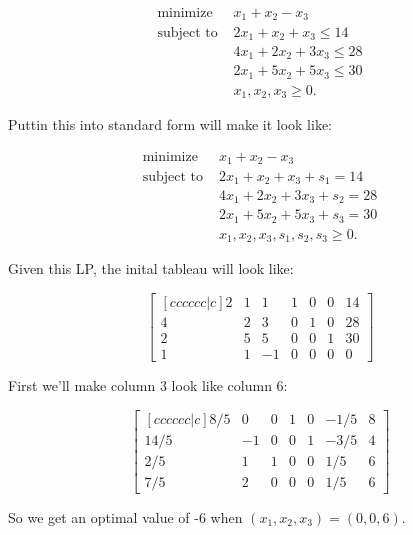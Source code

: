 \documentclass[12pt]{extarticle}
\theoremstyle{definition}
\begin{document}
\begin{problem} 

	\begin{align*}
	\text{minimize } &x_1+x_2-x_3\\
	\text{subject to } &2x_1+x_2+x_3\leq 14\\
	&4x_1+2x_2+3x_3\leq 28\\
	&2x_1+5x_2+5x_3\leq 30\\
	&x_1, x_2, x_3\geq 0.
	\end{align*}

	Puttin this into standard form will make it look like:

	\begin{align*}
	\text{minimize } &x_1+x_2-x_3\\
	\text{subject to } &2x_1+x_2+x_3+s_1 = 14\\
	&4x_1+2x_2+3x_3+s_2 = 28\\
	&2x_1+5x_2+5x_3+s_3 = 30\\
	&x_1, x_2, x_3, s_1, s_2, s_3\geq 0.
	\end{align*}

	Given this LP, the inital tableau will look like:

	$$\begin{bmatrix}[cccccc|c] 2&1&1&1&0&0&14\\ 4&2&3&0&1&0&28\\ 2&5&5&0&0&1&30\\ 1&1&-1&0&0&0&0 \end{bmatrix}$$

	First we'll make column 3 look like column 6:

	$$\begin{bmatrix}[cccccc|c] 8/5&0&0&1&0&-1/5&8\\ 14/5&-1&0&0&1&-3/5&4\\ 2/5&1&1&0&0&1/5&6\\ 7/5&2&0&0&0&1/5&6 \end{bmatrix}$$

	So we get an optimal value of -6 when $(x_1,x_2,x_3)=(0,0,6)$.


\end{problem}
\end{document}
